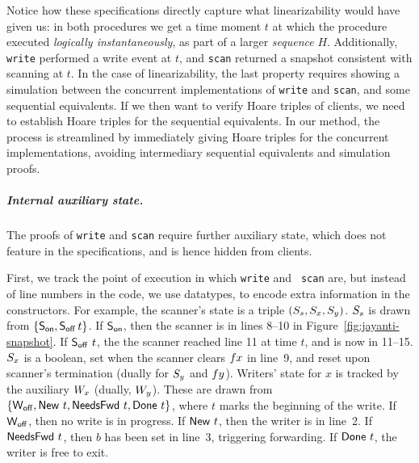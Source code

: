 
Notice how these specifications directly capture what linearizability
would have given us: in both procedures we get a time moment $t$ at
which the procedure executed \emph{logically instantaneously}, as part
of a larger \emph{sequence} $H$. Additionally, {\tt write} performed a
write event at $t$, and {\tt scan} returned a snapshot consistent with
scanning at $t$. In the case of linearizability, the last property
requires showing a simulation between the concurrent implementations
of {\tt write} and {\tt scan}, and some sequential equivalents. If we
then want to verify Hoare triples of clients, we need to establish
Hoare triples for the sequential equivalents. In our method, the
process is streamlined by immediately giving Hoare triples for the
concurrent implementations, avoiding intermediary sequential
equivalents and simulation proofs.

\subparagraph*{Internal auxiliary state.} 
The proofs of {\tt write} and {\tt scan} require further auxiliary
state, which does not feature in the specifications, and is hence
hidden from clients.

First, we track the point of execution in which {\tt write} and {\tt
  scan} are, but instead of line numbers in the code, we use
datatypes, to encode extra information in the constructors.
%
For example, the scanner's state is a triple $(S_s, S_x,
S_y)$. $S_s$ is drawn from $\{ \mathsf{S_{on}}, \mathsf{S_{off}}\, t\}$. If $\mathsf{S_{on}}$, then
the scanner is in lines 8--10 in Figure~\ref{fig:jayanti-snapshot}. If
$\mathsf{S_{off}}\ t$, the the scanner reached line 11 at time $t$, and is now in
11--15.  $S_x$ is a boolean, set when the scanner clears $fx$ in
line~9, and reset upon scanner's termination (dually for $S_y$ and
$fy$).
%
Writers' state for $x$ is tracked by the auxiliary $W_x$ (dually,
$W_y$). These are drawn from $\{\mathsf{W_{off}}, \mathsf{New}\ t, \mathsf{NeedsFwd}\ t,
\mathsf{Done}\ t\}$, where $t$ marks the beginning of the write. If
$\mathsf{W_{off}}$, then no write is in progress. If $\mathsf{New}\ t$, then the
writer is in line~2. If $\mathsf{NeedsFwd}\ t$, then $b$ has been set in line~3,
triggering forwarding. If $\mathsf{Done}\ t$, the writer is free to exit.

